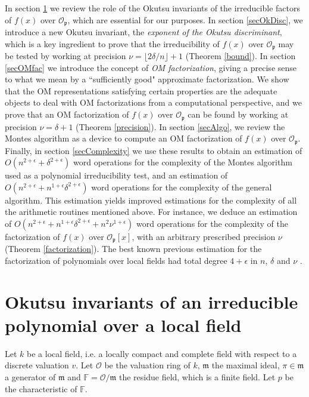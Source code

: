\documentclass{amsart}
\begin{document}
In section \ref{secOkutsu} we review the role of the Okutsu invariants of the irreducible factors of $f(x)$ over ${\mathcal{O}}_{\mathfrak{p}}$, which are essential for our purposes. In section \ref{secOkDisc}, we introduce a new Okutsu invariant, the \emph{exponent of the Okutsu discriminant}, which is a key ingredient to prove that the irreducibility of $f(x)$ over ${\mathcal{O}}_{\mathfrak{p}}$ may be tested by working at precision $\nu=\lfloor2\delta/n\rfloor+1$ (Theorem \ref{bound}). In section \ref{secOMfac} we introduce the concept of \emph{OM factorization}, giving a precise sense to what we mean by a ``sufficiently good" approximate factorization. We show that the OM representations satisfying certain properties are the adequate objects to deal with OM factorizations from a computational perspective, and we prove that an OM factorization of $f(x)$ over ${\mathcal{O}}_{\mathfrak{p}}$ can be found by working at precision $\nu=\delta+1$ (Theorem \ref{precision}). In section \ref{secAlgo}, we review the Montes algorithm as a device to compute an OM factorization of $f(x)$ over ${\mathcal{O}}_{\mathfrak{p}}$. Finally, in section \ref{secComplexity} we use these results to obtain an estimation of $O(n^{2+\epsilon}+\delta^{2+\epsilon})$ word operations for the complexity of the Montes algorithm used as a polynomial irreducibility test, and an estimation of $O(n^{2+\epsilon}+n^{1+\epsilon}\delta^{2+\epsilon})$ word operations for the complexity of the general algorithm.
This estimation yields improved estimations for the complexity of all the arithmetic routines mentioned above. For instance, we deduce an estimation of $O\left(n^{2+\epsilon}+n^{1+\epsilon}\delta^{2+\epsilon}+n^2\nu^{1+\epsilon}\right)$ word operations for the complexity of the factorization of $f(x)$ over ${\mathcal{O}}_{\mathfrak{p}}[x]$, with an arbitrary prescribed precision $\nu$ (Theorem \ref{factorization}). The best known previous estimation for the factorization of polynomials over local fields had total degree $4+\epsilon$ in $n$, $\delta$ and $\nu$ \cite{GNP}. 

\section{Okutsu invariants of an irreducible polynomial over a local field}\label{secOkutsu} 
Let $k$ be a local field, i.e. a locally compact and complete field with respect to a discrete valuation $v$. Let ${\mathcal{O}}$ be the valuation ring of $k$, ${{\mathfrak m}}$ the maximal ideal, $\pi\in{{\mathfrak m}}$ a generator of ${{\mathfrak m}}$ and ${\mathbb F}={\mathcal{O}}/{{\mathfrak m}}$ the residue field, which is a finite field. Let $p$ be the characteristic of ${\mathbb F}$. 
\end{document}
